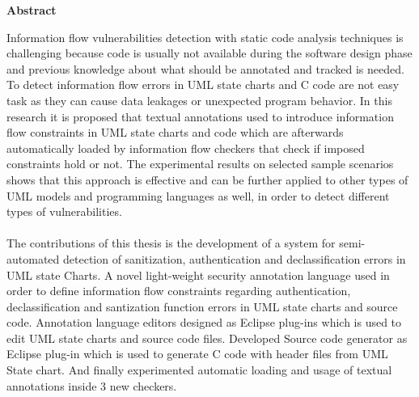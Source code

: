 

\clearemptydoublepage
{}
{}	





\vspace*{2cm}
\begin{center}
{\Large \bf Abstract}
\end{center}
\vspace{1cm}

Information flow vulnerabilities detection with static code analysis techniques is challenging because code
is usually not available during the software design phase and
previous knowledge about what should be annotated and tracked
is needed. To detect information flow errors in UML state
charts and C code are not easy task as they can cause data leakages or unexpected program behavior. In this research it is proposed that textual annotations used to
introduce information flow constraints in UML state charts and code which are afterwards automatically loaded by information flow checkers that check if imposed constraints hold or not. The experimental results on selected sample scenarios shows that this approach
is effective and can be further applied to other types of UML
models and programming languages as well, in order to detect
different types of vulnerabilities.\\ \\

The contributions of this thesis is the development of a system for semi-automated detection of sanitization, authentication and declassification errors in UML state Charts. A novel light-weight security annotation language
used in order to define information flow constraints regarding authentication, declassification and santization function errors  in UML state charts and source code.  Annotation language editors designed as Eclipse
plug-ins which is used to edit UML state charts and
source code files. Developed Source code generator as Eclipse plug-in which is used to generate C code with header files from UML State chart. And finally experimented automatic loading and usage of textual annotations
inside 3 new checkers.